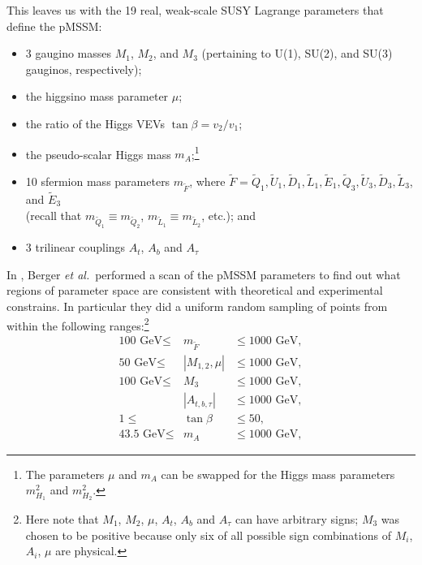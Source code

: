 This leaves us with the 19 real, weak-scale SUSY Lagrange parameters 
that define the pMSSM:
\begin{itemize}
   \item 3 gaugino masses $M_1$, $M_2$, and $M_3$ 
         (pertaining to U(1), SU(2), and SU(3) gauginos, respectively);         
   \item the higgsino mass parameter $\mu$;
   \item the ratio of the Higgs VEVs $\tan\beta=v_2/v_1$;
   \item the pseudo-scalar Higgs mass $m_A$;\footnote{The parameters $\mu$ and $m_A$  
         can be swapped for the Higgs mass parameters $m_{H_1}^2$ and $m_{H_2}^2$.}
   \item 10 sfermion mass parameters $m_{\tilde{F}}$, where 
         $\tilde{F} = \tilde{Q}_1, \tilde{U}_1, \tilde{D}_1, 
                      \tilde{L}_1, \tilde{E}_1, 
                      \tilde{Q}_3, \tilde{U}_3, \tilde{D}_3, 
                      \tilde{L}_3$, and $\tilde{E}_3$ \\ 
(recall that $m_{\tilde{Q}_1}\equiv m_{\tilde{Q}_2}$, 
           $m_{\tilde{L}_1}\equiv m_{\tilde{L}_2}$, etc.); and          
   \item 3 trilinear couplings $A_t$, $A_b$ and $A_\tau$                  
\end{itemize}
 
In \cite{Berger:2008cq}, Berger {\it et al.}\ performed a scan of the pMSSM parameters  
to find out what regions of parameter space are consistent with theoretical and experimental constrains. In particular they did a uniform random sampling of 
points from within the following ranges:\footnote{Here note that $M_1$, $M_2$, 
$\mu$, $A_t$, $A_b$ and $A_\tau$ can have 
arbitrary signs; $M_3$ was chosen to be positive because only six 
of all possible sign combinations of $M_i$, $A_i$, $\mu$ are physical.} 
\begin{eqnarray}
  \mbox{100 GeV} \leq 	& m_{\tilde{F}}  & \leq \mbox{1000 GeV},   \nonumber \\
  \mbox{50 GeV}  \leq	& |M_{1,2},\mu|  & \leq \mbox{1000 GeV}, 	 \nonumber \\
  \mbox{100 GeV} \leq	& M_3 	     & \leq \mbox{1000 GeV},   \\
	                  & |A_{t,b,\tau}| & \leq \mbox{1000 GeV}, 	 \nonumber \\
    1  \leq			& \tan\beta		& \leq 50,	  \nonumber \\
    \mbox{43.5 GeV}	\leq	& m_A			& \leq \mbox{1000 GeV},  \nonumber 
\end{eqnarray}

